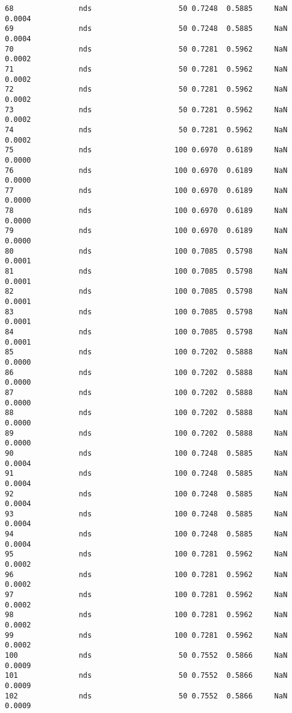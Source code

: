 \documentclass[11pt]{article}
\begin{document}
\begin{Verbatim}[commandchars=\\\{\}]
68               nds                    50 0.7248  0.5885     NaN 0.0004   
69               nds                    50 0.7248  0.5885     NaN 0.0004   
70               nds                    50 0.7281  0.5962     NaN 0.0002   
71               nds                    50 0.7281  0.5962     NaN 0.0002   
72               nds                    50 0.7281  0.5962     NaN 0.0002   
73               nds                    50 0.7281  0.5962     NaN 0.0002   
74               nds                    50 0.7281  0.5962     NaN 0.0002   
75               nds                   100 0.6970  0.6189     NaN 0.0000   
76               nds                   100 0.6970  0.6189     NaN 0.0000   
77               nds                   100 0.6970  0.6189     NaN 0.0000   
78               nds                   100 0.6970  0.6189     NaN 0.0000   
79               nds                   100 0.6970  0.6189     NaN 0.0000   
80               nds                   100 0.7085  0.5798     NaN 0.0001   
81               nds                   100 0.7085  0.5798     NaN 0.0001   
82               nds                   100 0.7085  0.5798     NaN 0.0001   
83               nds                   100 0.7085  0.5798     NaN 0.0001   
84               nds                   100 0.7085  0.5798     NaN 0.0001   
85               nds                   100 0.7202  0.5888     NaN 0.0000   
86               nds                   100 0.7202  0.5888     NaN 0.0000   
87               nds                   100 0.7202  0.5888     NaN 0.0000   
88               nds                   100 0.7202  0.5888     NaN 0.0000   
89               nds                   100 0.7202  0.5888     NaN 0.0000   
90               nds                   100 0.7248  0.5885     NaN 0.0004   
91               nds                   100 0.7248  0.5885     NaN 0.0004   
92               nds                   100 0.7248  0.5885     NaN 0.0004   
93               nds                   100 0.7248  0.5885     NaN 0.0004   
94               nds                   100 0.7248  0.5885     NaN 0.0004   
95               nds                   100 0.7281  0.5962     NaN 0.0002   
96               nds                   100 0.7281  0.5962     NaN 0.0002   
97               nds                   100 0.7281  0.5962     NaN 0.0002   
98               nds                   100 0.7281  0.5962     NaN 0.0002   
99               nds                   100 0.7281  0.5962     NaN 0.0002   
100              nds                    50 0.7552  0.5866     NaN 0.0009   
101              nds                    50 0.7552  0.5866     NaN 0.0009   
102              nds                    50 0.7552  0.5866     NaN 0.0009   

\end{Verbatim}
\end{document}
